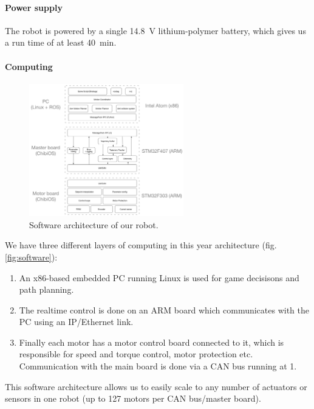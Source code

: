 \documentclass[a4paper]{paper}
\begin{document}
\paragraph{Power supply}
The robot is powered by a single \SI{14.8}{\volt} lithium-polymer battery, which gives us a run time of at least \SI{40}{\minute}.

\paragraph{Computing}
\begin{figure}[h]
    \begin{center}
        \includegraphics[width=0.6\textwidth]{images/software}
        \caption{Software architecture of our robot.}
        \label{fig:balise}
    \end{center}
\end{figure}

We have three different layers of computing in this year architecture (fig. \ref{fig:software}):
\begin{enumerate}
    \item An x86-based embedded PC running Linux is used for game decisisons and path planning.
    \item The realtime control is done on an ARM board which communicates with the PC using an IP/Ethernet link.
    \item Finally each motor has a motor control board connected to it, which is responsible for speed and torque control, motor protection etc.
        Communication with the main board is done via a CAN bus running at \si{1}{\mega\hertz}.
\end{enumerate}


This software architecture allows us to easily scale to any number of actuators or sensors in one robot (up to 127 motors per CAN bus/master board).
\end{document}
